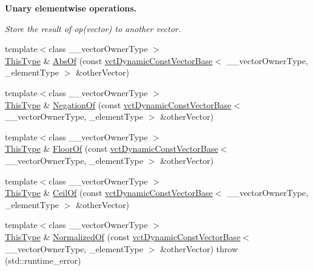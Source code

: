 \begin{Indent}{\bf Unary elementwise operations.}\par
{\em Store the result of op(vector) to another vector. }\begin{DoxyCompactItemize}
\item 
{\footnotesize template$<$class \+\_\+\+\_\+vector\+Owner\+Type $>$ }\\\hyperlink{classvct_dynamic_const_vector_base_a39da273523717f678f54d3321ebca3dd}{This\+Type} \& \hyperlink{classvct_dynamic_vector_base_a41137c2be55ad6cfdfedb695e7b82ead}{Abs\+Of} (const \hyperlink{classvct_dynamic_const_vector_base}{vct\+Dynamic\+Const\+Vector\+Base}$<$ \+\_\+\+\_\+vector\+Owner\+Type, \+\_\+element\+Type $>$ \&other\+Vector)
\item 
{\footnotesize template$<$class \+\_\+\+\_\+vector\+Owner\+Type $>$ }\\\hyperlink{classvct_dynamic_const_vector_base_a39da273523717f678f54d3321ebca3dd}{This\+Type} \& \hyperlink{classvct_dynamic_vector_base_a9f6f640db32ecb6de8c30fe6e4ea708e}{Negation\+Of} (const \hyperlink{classvct_dynamic_const_vector_base}{vct\+Dynamic\+Const\+Vector\+Base}$<$ \+\_\+\+\_\+vector\+Owner\+Type, \+\_\+element\+Type $>$ \&other\+Vector)
\item 
{\footnotesize template$<$class \+\_\+\+\_\+vector\+Owner\+Type $>$ }\\\hyperlink{classvct_dynamic_const_vector_base_a39da273523717f678f54d3321ebca3dd}{This\+Type} \& \hyperlink{classvct_dynamic_vector_base_ad0f2f07cd961899b254df8ea725d1bc7}{Floor\+Of} (const \hyperlink{classvct_dynamic_const_vector_base}{vct\+Dynamic\+Const\+Vector\+Base}$<$ \+\_\+\+\_\+vector\+Owner\+Type, \+\_\+element\+Type $>$ \&other\+Vector)
\item 
{\footnotesize template$<$class \+\_\+\+\_\+vector\+Owner\+Type $>$ }\\\hyperlink{classvct_dynamic_const_vector_base_a39da273523717f678f54d3321ebca3dd}{This\+Type} \& \hyperlink{classvct_dynamic_vector_base_aa0c44a54e66a3a355da37e5eec4b3835}{Ceil\+Of} (const \hyperlink{classvct_dynamic_const_vector_base}{vct\+Dynamic\+Const\+Vector\+Base}$<$ \+\_\+\+\_\+vector\+Owner\+Type, \+\_\+element\+Type $>$ \&other\+Vector)
\item 
{\footnotesize template$<$class \+\_\+\+\_\+vector\+Owner\+Type $>$ }\\\hyperlink{classvct_dynamic_const_vector_base_a39da273523717f678f54d3321ebca3dd}{This\+Type} \& \hyperlink{classvct_dynamic_vector_base_aa5ef903765165168fa48f9c5f8403fd5}{Normalized\+Of} (const \hyperlink{classvct_dynamic_const_vector_base}{vct\+Dynamic\+Const\+Vector\+Base}$<$ \+\_\+\+\_\+vector\+Owner\+Type, \+\_\+element\+Type $>$ \&other\+Vector)  throw (std\+::runtime\+\_\+error)
\end{DoxyCompactItemize}
\end{Indent}
